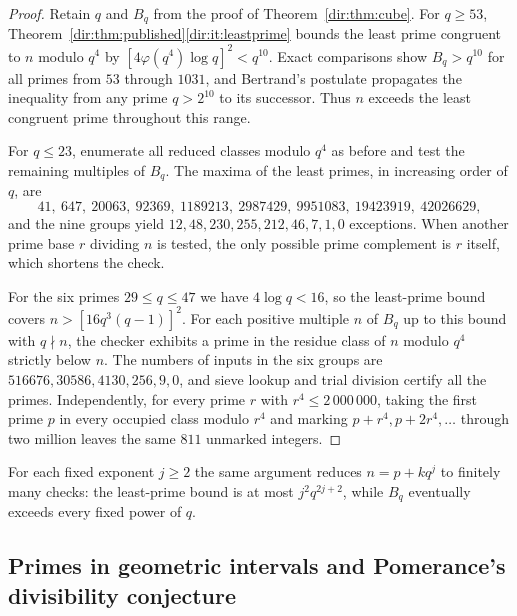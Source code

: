 \begin{proof}
Retain $q$ and $B_q$ from the proof of Theorem~\ref{dir:thm:cube}. For $q\ge53$,
Theorem~\ref{dir:thm:published}\ref{dir:it:leastprime} bounds the least prime congruent to $n$
modulo $q^4$ by $[4\varphi(q^4)\log q]^2<q^{10}$. Exact comparisons show $B_q>q^{10}$
for all primes from $53$ through $1031$, and Bertrand's postulate propagates the
inequality from any prime $q>2^{10}$ to its successor. Thus $n$ exceeds the least
congruent prime throughout this range.

For $q\le23$, enumerate all reduced classes modulo $q^4$ as before and test the
remaining multiples of $B_q$. The maxima of the least primes, in increasing order of
$q$, are
\[
 41,\ 647,\ 20063,\ 92369,\ 1189213,\ 2987429,\ 9951083,\ 19423919,\ 42026629,
\]
and the nine groups yield $12,48,230,255,212,46,7,1,0$ exceptions. When another prime
base $r$ dividing $n$ is tested, the only possible prime complement is $r$ itself,
which shortens the check.

For the six primes $29\le q\le47$ we have $4\log q<16$, so the least-prime bound covers
$n>[16q^3(q-1)]^2$. For each positive multiple $n$ of $B_q$ up to this bound with
$q\nmid n$, the checker exhibits a prime in the residue class of $n$ modulo $q^4$
strictly below $n$. The numbers of inputs in the six groups are
$516676,30586,4130,256,9,0$, and sieve lookup and trial division certify all the
primes. Independently, for every prime $r$ with $r^4\le2\,000\,000$, taking the first
prime $p$ in every occupied class modulo $r^4$ and marking $p+r^4,p+2r^4,\dots$ through
two million leaves the same $811$ unmarked integers.
\end{proof}

\begin{remark}\label{dir:rem:powers}
For each fixed exponent $j\ge2$ the same argument reduces $n=p+kq^j$ to finitely many
checks: the least-prime bound is at most $j^2q^{2j+2}$, while $B_q$ eventually exceeds
every fixed power of $q$.
\end{remark}

\subsection{Primes in geometric intervals and Pomerance's divisibility conjecture}
\label{dir:sec:geometric}


